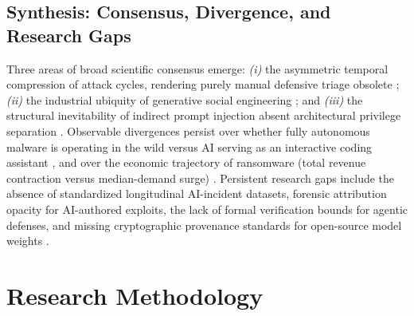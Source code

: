 \documentclass[conference,10pt,twocolumn,a4paper]{IEEEtran}
\begin{document}
\subsection{Synthesis: Consensus, Divergence, and Research Gaps}
Three areas of broad scientific consensus emerge: \emph{(i)} the asymmetric temporal compression of attack cycles, rendering purely manual defensive triage obsolete \cite{enisa_frontier_2026, crowdstrike_gtr_2025}; \emph{(ii)} the industrial ubiquity of generative social engineering \cite{enisa_etl_2025, slashnext_genai_2025}; and \emph{(iii)} the structural inevitability of indirect prompt injection absent architectural privilege separation \cite{greshake2023indirect}. Observable divergences persist over whether fully autonomous malware is operating in the wild versus AI serving as an interactive coding assistant \cite{enisa_etl_2025, crowdstrike_gtr_2025}, and over the economic trajectory of ransomware (total revenue contraction versus median-demand surge) \cite{chainalysis_crypto_crime_2026, sophos_ransomware_2025}. Persistent research gaps include the absence of standardized longitudinal AI-incident datasets, forensic attribution opacity for AI-authored exploits, the lack of formal verification bounds for agentic defenses, and missing cryptographic provenance standards for open-source model weights \cite{nist_sp_ai_100_2e2025, cisa_aa26_251a}.

\section{Research Methodology}
\label{sec:methodology}
\end{document}
